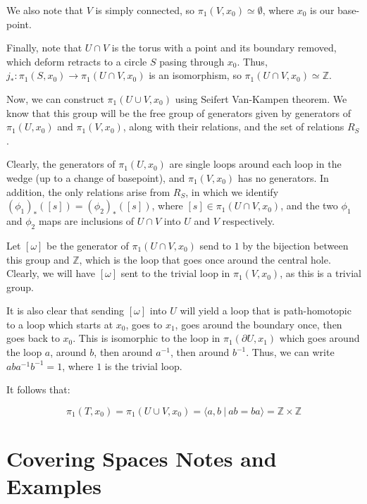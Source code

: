 \documentclass[10pt, oneside]{amsart}
\begin{document}
    We also note that $V$ is simply connected, so $\pi_1(V, x_0) \simeq \emptyset$, where $x_0$ is our base-point.
    \newline

    Finally, note that $U \cap V$ is the torus with a point and its boundary removed, which deform retracts to a circle $S$ pasing through $x_0$. Thus, $j_{*} : \pi_1(S, x_0) \rightarrow \pi_1(U \cap V, x_0)$
    is an isomorphism, so $\pi_1(U \cap V, x_0) \simeq \mathbb{Z}$.
    \newline

    Now, we can construct $\pi_1(U \cup V, x_0)$ using Seifert Van-Kampen theorem. We know that this group will be the free group of generators given by generators of $\pi_1(U, x_0)$ and $\pi_1(V, x_0)$, along
    with their relations, and the set of relations $R_S$.
    \newline

    Clearly, the generators of $\pi_1(U, x_0)$ are single loops around each loop in the wedge (up to a change of basepoint), and $\pi_1(V, x_0)$ has no generators. In addition, the only relations arise from $R_S$, in which we identify
    $(\phi_1)_{*}([s]) = (\phi_2)_{*}([s])$, where $[s] \in \pi_1(U \cap V, x_0)$, and the two $\phi_1$ and $\phi_2$ maps are inclusions of $U \cap V$ into $U$ and $V$ respectively.
    \newline

    Let $[\omega]$ be the generator of $\pi_1(U \cap V, x_0)$ send to $1$ by the bijection between this group and $\mathbb{Z}$, which is the loop that goes once around the central hole.
    Clearly, we will have $[\omega]$ sent to the trivial loop in $\pi_1(V, x_0)$, as this
    is a trivial group.
    \newline

    It is also clear that sending $[\omega]$ into $U$ will yield a loop that is path-homotopic to a loop which starts at $x_0$, goes to $x_1$, goes around the boundary once, then goes back to $x_0$.
    This is isomorphic to the loop in $\pi_1(\partial U, x_1)$ which goes around the loop $a$, around $b$, then around $a^{-1}$, then around $b^{-1}$. Thus, we can write $ab a^{-1} b^{-1} = 1$, where $1$ is the trivial loop.
    \newline

    It follows that:

    $$\pi_1(T, x_0) = \pi_1(U \cup V, x_0) = \langle a, b \ | \ ab = ba \rangle = \mathbb{Z} \times \mathbb{Z}$$

    \section{Covering Spaces Notes and Examples}
\end{document}
